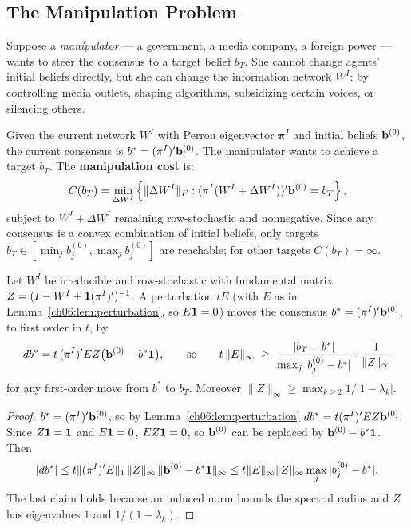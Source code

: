 \documentclass[../structural_economics_book.tex]{subfiles}
\begin{document}
\subsection{The Manipulation Problem}

Suppose a \textit{manipulator} --- a government, a media company, a foreign power --- wants to steer the consensus to a target belief $b_T$. She cannot change agents' initial beliefs directly, but she can change the information network $W^I$: by controlling media outlets, shaping algorithms, subsidizing certain voices, or silencing others.

\begin{definition}\label{ch08:def:manip_cost}
Given the current network $W^I$ with Perron eigenvector $\boldsymbol{\pi}^I$ and initial beliefs $\mathbf{b}^{(0)}$, the current consensus is $b^* = (\pi^I)'\mathbf{b}^{(0)}$. The manipulator wants to achieve a target $b_T$. The \textbf{manipulation cost} is:
\begin{equation}\label{ch08:eq:manip_cost}
C(b_T) = \min_{\Delta W^I} \left\{\|\Delta W^I\|_F : (\pi^I(W^I + \Delta W^I))'\mathbf{b}^{(0)} = b_T\right\},
\end{equation}
subject to $W^I + \Delta W^I$ remaining row-stochastic and nonnegative. Since any consensus is a convex combination of initial beliefs, only targets $b_T \in [\min_j b_j^{(0)}, \max_j b_j^{(0)}]$ are reachable; for other targets $C(b_T) = \infty$.
\end{definition}

\begin{proposition}\label{ch08:thm:manipulation}
Let $W^I$ be irreducible and row-stochastic with fundamental matrix $Z = (I - W^I + \mathbf{1}(\pi^I)')^{-1}$. A perturbation $tE$ (with $E$ as in Lemma~\ref{ch06:lem:perturbation}, so $E\mathbf{1} = 0$) moves the consensus $b^* = (\pi^I)'\mathbf{b}^{(0)}$, to first order in $t$, by
\begin{equation}\label{ch08:eq:manip_result}
db^* = t\,(\pi^I)'EZ\bigl(\mathbf{b}^{(0)} - b^*\mathbf{1}\bigr), \qquad\text{so}\qquad
t\,\|E\|_\infty \;\geq\; \frac{|b_T - b^*|}{\max_j |b_j^{(0)} - b^*|} \cdot \frac{1}{\|Z\|_\infty}
\end{equation}
for any first-order move from $b^*$ to $b_T$. Moreover $\|Z\|_\infty \geq \max_{k\geq2} 1/|1 - \lambda_k|$.
\end{proposition}

\begin{proof}
$b^* = (\pi^I)'\mathbf{b}^{(0)}$, so by Lemma~\ref{ch06:lem:perturbation} $db^* = t(\pi^I)'EZ\mathbf{b}^{(0)}$. Since $Z\mathbf{1} = \mathbf{1}$ and $E\mathbf{1} = 0$, $EZ\mathbf{1} = 0$, so $\mathbf{b}^{(0)}$ can be replaced by $\mathbf{b}^{(0)} - b^*\mathbf{1}$. Then
\begin{equation*}
|db^*| \leq t\|(\pi^I)'E\|_1\,\|Z\|_\infty\,\|\mathbf{b}^{(0)} - b^*\mathbf{1}\|_\infty \leq t\|E\|_\infty\|Z\|_\infty\max_j|b_j^{(0)} - b^*| .
\end{equation*} The last claim holds because an induced norm bounds the spectral radius and $Z$ has eigenvalues $1$ and $1/(1-\lambda_k)$.
\end{proof}
\end{document}
